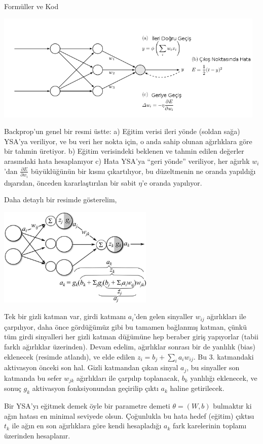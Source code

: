 \documentclass[12pt,fleqn]{article}\usepackage{../../common}
\begin{document}
Formüller ve Kod

\includegraphics[width=35em]{mlp_07.png}

Backprop'un genel bir resmi üstte: a) Eğitim verisi ileri yönde (soldan
sağa) YSA'ya veriliyor, ve bu veri her nokta için, o anda sahip olunan
ağırlıklara göre bir tahmin üretiyor. b) Eğitim verisindeki beklenen ve
tahmin edilen değerler arasındaki hata hesaplanıyor c) Hata YSA'ya ``geri
yönde'' veriliyor, her ağırlık $w_i$'dan $\frac{\partial E}{\partial w_i}$
büyüklüğünün bir kısmı çıkartılıyor, bu düzeltmenin ne oranda yapıldığı
dışarıdan, önceden kararlaştırılan bir sabit $\eta$'e oranda
yapılıyor. 

Daha detaylı bir resimde gösterelim,

\includegraphics[width=20em]{neural-net.png}

Tek bir gizli katman var, girdi katmanı $a_i$'den gelen sinyaller $w_{ij}$
ağırlıkları ile çarpılıyor, daha önce gördüğümüz gibi bu tamamen bağlanmış
katman, çünkü tüm girdi sinyalleri her gizli katman düğümüne hep beraber
giriş yapıyorlar (tabii farklı ağırlıklar üzerinden). Devam edelim,
ağırlıklar sonrası bir de yanlılık (bias) eklenecek (resimde atlandı), ve
elde edilen $z_i = b_j + \sum_i a_i w_{ij}$. Bu 3. katmandaki aktivasyon
önceki son hal. Gizli katmandan çıkan sinyal $a_j$, bu sinyaller son
katmanda bu sefer $w_{jk}$ ağırlıkları ile çarpılıp toplanacak, $b_k$
yanlılığı eklenecek, ve sonuç $g_k$ aktivasyon fonksiyonundan geçirilip
çıktı $a_k$ haline getirilecek.

Bir YSA'yı eğitmek demek öyle bir parametre demeti $\theta = (W,b)$
bulmaktır ki ağın hatası en minimal seviyede olsun. Çoğunlukla bu hata
hedef (eğitim) çıktısı $t_k$ ile ağın en son ağırlıklara göre kendi
hesapladığı $a_k$ fark karelerinin toplamı üzerinden hesaplanır. 
\end{document}
